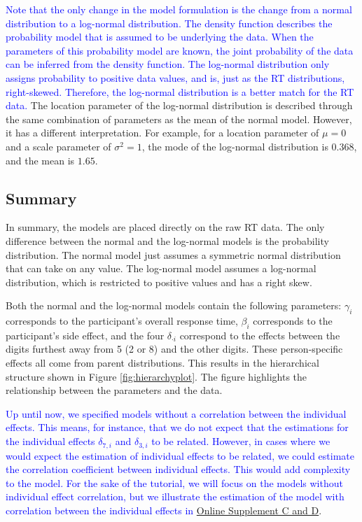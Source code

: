\documentclass[
  english,
  doc,floatsintext]{apa6}
\begin{document}
\textcolor{blue}{Note that the only change in the model formulation is the change from a normal distribution to a log-normal distribution. The density function describes the probability model that is assumed to be underlying the data. When the parameters of this probability model are known, the joint probability of the data can be inferred from the density function. The log-normal distribution only assigns probability to positive data values, and is, just as the RT distributions, right-skewed. Therefore, the log-normal distribution is a better match for the RT data.} The location parameter of the log-normal distribution is described through the same combination of parameters as the mean of the normal model. However, it has a different interpretation. For example, for a location parameter of \(\mu = 0\) and a scale parameter of \(\sigma^2 = 1\), the mode of the log-normal distribution is \(0.368\), and the mean is \(1.65\).

\hypertarget{summary}{%
\subsection{Summary}\label{summary}}

In summary, the models are placed directly on the raw RT data. The only difference between the normal and the log-normal models is the probability distribution. The normal model just assumes a symmetric normal distribution that can take on any value. The log-normal model assumes a log-normal distribution, which is restricted to positive values and has a right skew.

Both the normal and the log-normal models contain the following parameters: \(\gamma_i\) corresponds to the participant's overall response time, \(\beta_i\) corresponds to the participant's side effect, and the four \(\delta_{\cdot i}\) correspond to the effects between the digits furthest away from 5 (2 or 8) and the other digits. These person-specific effects all come from parent distributions. This results in the hierarchical structure shown in Figure \ref{fig:hierarchyplot}. The figure highlights the relationship between the parameters and the data.

\textcolor{blue}{Up until now, we specified models without a correlation between the individual effects. This means, for instance, that we do not expect that the estimations for the individual effects $\delta_{7, i}$ and $\delta_{3, i}$ to be related. However, in cases where we would expect the estimation of individual effects to be related, we could estimate the correlation coefficient between individual effects. This would add complexity to the model. For the sake of the tutorial, we will focus on the models without individual effect correlation, but we illustrate the estimation of the model with correlation between the individual effects in} \href{https://github.com/MyrtheV/Bayesian-Hierarchical-Modelling-An-Introduction-and-Reassessment}{Online Supplement C and D}.
\end{document}
